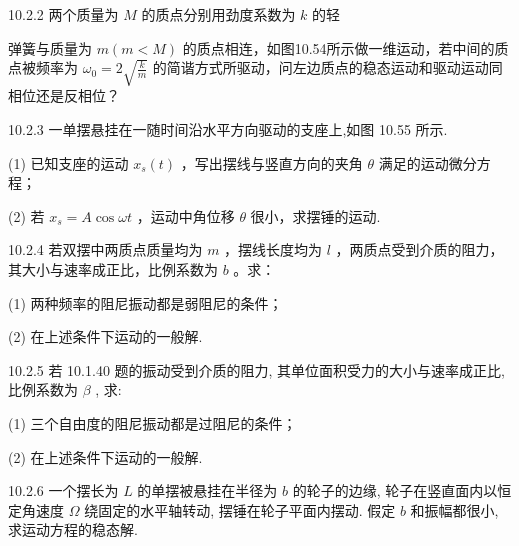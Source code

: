 \begin{problem}{10.2.2}
两个质量为 $M$ 的质点分别用劲度系数为 $k$ 的轻

弹簧与质量为 $m(m < M)$ 的质点相连，如图10.54所示做一维运动，若中间的质点被频率为 $\omega_0 = 2\sqrt{\frac{k}{m}}$ 的简谐方式所驱动，问左边质点的稳态运动和驱动运动同相位还是反相位？
\begin{center}

\end{center}
\end{problem}
\clearpage


\begin{problem}{10.2.3}
一单摆悬挂在一随时间沿水平方向驱动的支座上,如图 10.55 所示.

(1) 已知支座的运动 $x_{s}(t)$ ，写出摆线与竖直方向的夹角 $\theta$ 满足的运动微分方程；

(2) 若 $x_{s}=A\cos\omega t$ ，运动中角位移 $\theta$ 很小，求摆锤的运动.
\begin{center}

\end{center}
\end{problem}
\clearpage


\begin{problem}{10.2.4}
若双摆中两质点质量均为 $m$ ，摆线长度均为 $l$ ，两质点受到介质的阻力，其大小与速率成正比，比例系数为 $b$ 。求：

(1) 两种频率的阻尼振动都是弱阻尼的条件；

(2) 在上述条件下运动的一般解.
\end{problem}
\clearpage


\begin{problem}{10.2.5}
若 10.1.40 题的振动受到介质的阻力, 其单位面积受力的大小与速率成正比, 比例系数为 $\beta$ , 求:

(1) 三个自由度的阻尼振动都是过阻尼的条件；

(2) 在上述条件下运动的一般解.
\end{problem}
\clearpage


\begin{problem}{10.2.6}
一个摆长为 $L$ 的单摆被悬挂在半径为 $b$ 的轮子的边缘, 轮子在竖直面内以恒定角速度 $\Omega$ 绕固定的水平轴转动, 摆锤在轮子平面内摆动. 假定 $b$ 和振幅都很小, 求运动方程的稳态解.
\end{problem}
\clearpage


